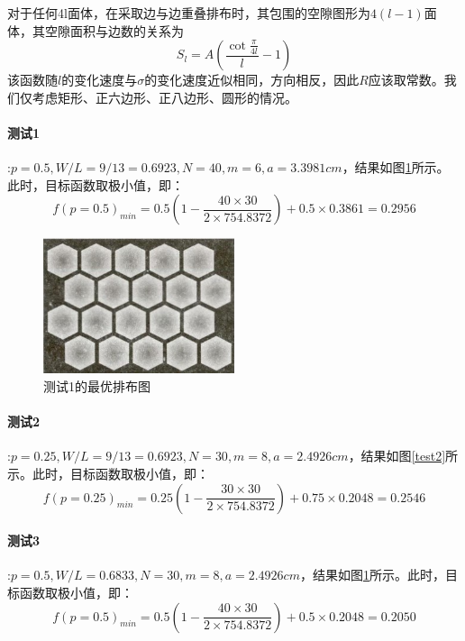 \documentclass{my_paper}
\begin{document}
对于任何4l面体，在采取边与边重叠排布时，其包围的空隙图形为$4(l-1)$面体，其空隙面积与边数的关系为
\begin{equation*}
    S_{l}=A(\frac{\cot \frac{\pi}{4l}}{l}-1)
\end{equation*}
该函数随$l$的变化速度与$\sigma$的变化速度近似相同，方向相反，因此$R$应该取常数。我们仅考虑矩形、正六边形、正八边形、圆形的情况。

\paragraph{测试1}:$p=0.5,W/L=9/13=0.6923,N=40,m=6,a=3.3981cm$，结果如图\ref{test1}所示。此时，目标函数取极小值，即：
\begin{equation*}
    f(p=0.5)_{min}=0.5(1-\frac{40\times 30}{2\times 754.8372})+0.5 \times 0.3861=0.2956
\end{equation*}

\begin{figure}[h]
    \centering
    \includegraphics[width=0.5\textwidth]{test1.jpg}
    \caption{测试1的最优排布图}
    \label{test1}
\end{figure}


\paragraph{测试2}:$p=0.25,W/L=9/13=0.6923,N=30,m=8,a=2.4926cm$，结果如图\ref{test2}所示。此时，目标函数取极小值，即：
\begin{equation*}
    f(p=0.25)_{min}=0.25(1-\frac{30\times 30}{2\times 754.8372})+0.75 \times 0.2048=0.2546
\end{equation*}


\paragraph{测试3}:$p=0.5,W/L=0.6833,N=30,m=8,a=2.4926cm$，结果如图\ref{test1}所示。此时，目标函数取极小值，即：
\begin{equation*}
    f(p=0.5)_{min}=0.5(1-\frac{40\times 30}{2\times 754.8372})+0.5 \times 0.2048=0.2050
\end{equation*}
\end{document}
